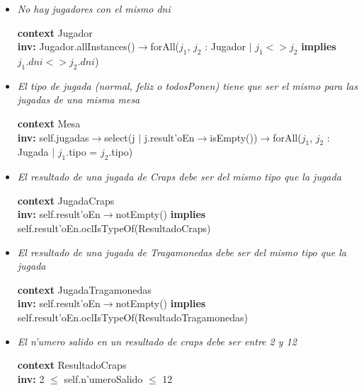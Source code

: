 \begin{itemize}
  

\item \textit{No hay jugadores con el mismo dni}

\textbf{context}  Jugador \\ \textbf{inv:}
    Jugador.allInstances()$\rightarrow$forAll($j_{1}$, $j_{2}$ : Jugador $|$ $j_{1} < > j_{2}$ \textbf{implies} $j_{1}.dni < > j_{2}.dni$)



\item \textit{El tipo de jugada (normal, feliz o todosPonen) tiene que ser el mismo para las jugadas de una misma mesa}

\textbf{context} Mesa \\ \textbf{inv:}
    self.jugadas$\rightarrow$select(j $|$ j.result'oEn$\rightarrow$isEmpty())$\rightarrow$forAll($j_{1}$, $j_{2}$ : Jugada $|$ $j_{1}$.tipo = $j_{2}$.tipo)
  
  

\item \textit{El resultado de una jugada de Craps debe ser del mismo tipo que la jugada}

\textbf{context} JugadaCraps \\ \textbf{inv:}
    self.result'oEn$\rightarrow$notEmpty() \textbf{implies} self.result'oEn.oclIsTypeOf(ResultadoCraps)



\item \textit{El resultado de una jugada de Tragamonedas debe ser del mismo tipo que la jugada}

\textbf{context} JugadaTragamonedas \\ \textbf{inv:}
    self.result'oEn$\rightarrow$notEmpty() \textbf{implies} self.result'oEn.oclIsTypeOf(ResultadoTragamonedas)



\item \textit{El n'umero salido en un resultado de craps debe ser entre 2 y 12}

\textbf{context} ResultadoCraps \\ \textbf{inv:}
    2 $\leq$ self.n'umeroSalido $\leq$ 12




\end{itemize}
